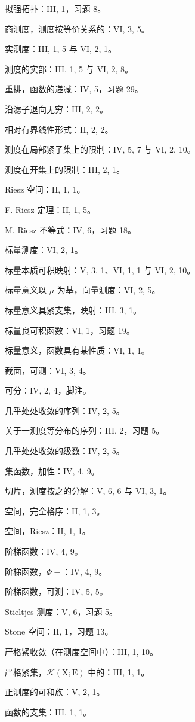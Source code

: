 拟强拓扑：III, 1，习题 8。

商测度，测度按等价关系的：VI, 3, 5。

实测度：III, 1, 5 与 VI, 2, 1。

测度的实部：III, 1, 5 与 VI, 2, 8。

重排，函数的递减：IV, 5，习题 29。

沿滤子退向无穷：III, 2, 2。

相对有界线性形式：II, 2, 2。

测度在局部紧子集上的限制：IV, 5, 7 与 VI, 2, 10。

测度在开集上的限制：III, 2, 1。

Riesz 空间：II, 1, 1。

F. Riesz 定理：II, 1, 5。

M. Riesz 不等式：IV, 6，习题 18。

标量测度：VI, 2, 1。

标量本质可积映射：V, 3, 1、VI, 1, 1 与 VI, 2, 10。

标量意义以 \(\mu\) 为基，向量测度：VI, 2, 5。

标量意义具紧支集，映射：III, 3, 1。

标量良可积函数：VI, 1，习题 19。

标量意义，函数具有某性质：VI, 1, 1。

截面，可测：VI, 3, 4。

可分：IV, 2, 4，脚注。

几乎处处收敛的序列：IV, 2, 5。

关于一测度等分布的序列：III, 2，习题 5。

几乎处处收敛的级数：IV, 2, 5。

集函数，加性：IV, 4, 9。

切片，测度按之的分解：V, 6, 6 与 VI, 3, 1。

空间，完全格序：II, 1, 3。

空间，Riesz：II, 1, 1。

阶梯函数：IV, 4, 9。

阶梯函数，\(\Phi-\)：IV, 4, 9。

阶梯函数，可测：IV, 5, 5。

Stieltjes 测度：V, 6，习题 5。

Stone 空间：II, 1，习题 13。

严格紧收敛（在测度空间中）：III, 1, 10。

严格紧集，\(\mathcal{K}(\mathrm{X};\mathrm{E})\) 中的：III, 1, 1。

正测度的可和族：V, 2, 1。

函数的支集：III, 1, 1。

